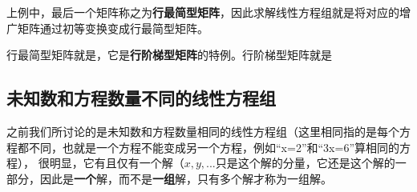 上例中，最后一个矩阵称之为\textbf{行最简型矩阵}，因此求解线性方程组就是将对应的增广矩阵通过初等变换变成行最简型矩阵。

行最简型矩阵就是，它是\textbf{行阶梯型矩阵}的特例。行阶梯型矩阵就是

\subsection{未知数和方程数量不同的线性方程组}
之前我们所讨论的是未知数和方程数量相同的线性方程组（这里相同指的是每个方程都不同，也就是一个方程不能变成另一个方程，例如“x=2”和“3x=6”算相同的方程），
很明显，它有且仅有一个解（$x,y,...$只是这个解的分量，它还是这个解的一部分，因此是\textbf{一个}解，而不是\textbf{一组}解，只有多个解才称为一组解。
